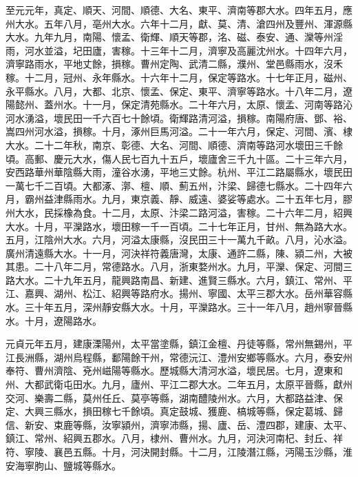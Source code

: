 \begin{pinyinscope}
 至元元年，真定、順天、河間、順德、大名、東平、濟南等郡大水。四年五月，應州大水。五年八月，亳州大水。六年十二月，獻、莫、清、滄四州及豐州、渾源縣大水。九年九月，南陽、懷孟、衛輝、順天等郡，洺、磁、泰安、通、灤等州淫雨，河水並溢，圮田廬，害稼。十三年十二月，濟寧及高麗沈州水。十四年六月，濟寧路雨水，平地丈餘，損稼。曹州定陶、武清二縣，濮州、堂邑縣雨水，沒禾稼。十二月，冠州、永年縣水。十六年十二月，保定等路水。十七年正月，磁州、永平縣水。八月，大都、北京、懷孟、保定、東平、濟寧等路水。十八年二月，遼陽懿州、蓋州水。十一月，保定清苑縣水。二十年六月，太原、懷孟、河南等路沁河水湧溢，壞民田一千六百七十餘頃。衛輝路清河溢，損稼。南陽府唐、鄧、裕、嵩四州河水溢，損稼。十月，涿州巨馬河溢。二十一年六月，保定、河間、濱、棣大水。二十二年秋，南京、彰德、大名、河間、順德、濟南等路河水壞田三千餘頃。高郵、慶元大水，傷人民七百九十五戶，壞廬舍三千九十區。二十三年六月，安西路華州華陰縣大雨，潼谷水湧，平地三丈餘。杭州、平江二路屬縣水，壞民田一萬七千二百頃。大都涿、漷、檀、順、薊五州，汴梁、歸德七縣水。二十四年六月，霸州益津縣雨水。九月，東京義、靜、威遠、婆娑等處水。二十五年七月，膠州大水，民採橡為食。十二月，太原、汴梁二路河溢，害稼。二十六年二月，紹興大水。十月，平灤路水，壞田稼一千一百頃。二十七年正月，甘州、無為路大水。五月，江陰州大水。六月，河溢太康縣，沒民田三十一萬九千畝。八月，沁水溢。廣州清遠縣大水。十一月，河決祥符義唐灣，太康、通許二縣，陳、潁二州，大被其患。二十八年二月，常德路水。八月，浙東婺州水。九月，平灤、保定、河間三路大水。二十九年五月，龍興路南昌、新建、進賢三縣水。六月，鎮江、常州、平江、嘉興、湖州、松江、紹興等路府水。揚州、寧國、太平三郡大水。岳州華容縣水。三十年五月，深州靜安縣大水。十月，平灤路水。三十一年八月，趙州寧晉縣水。十月，遼陽路水。



 元貞元年五月，建康溧陽州，太平當塗縣，鎮江金檀、丹徒等縣，常州無錫州，平江長洲縣，湖州烏程縣，鄱陽餘干州，常德沅江、澧州安鄉等縣水。六月，泰安州奉符、曹州濟陰、兗州嵫陽等縣水。歷城縣大清河水溢，壞民居。七月，遼東和州、大都武衛屯田水。九月，廬州、平江二郡大水。二年五月，太原平晉縣，獻州交河、樂壽二縣，莫州任丘、莫亭等縣，湖南醴陵州水。六月，大都路益津、保定、大興三縣水，損田稼七千餘頃。真定鼓城、獲鹿、槁城等縣，保定葛城、歸信、新安、束鹿等縣，汝寧潁州，濟寧沛縣，揚、廬、岳、澧四郡，建康、太平、鎮江、常州、紹興五郡水。八月，棣州、曹州水。九月，河決河南杞、封丘、祥符、寧陵、襄邑五縣。十月，河決開封縣。十二月，江陵潛江縣，沔陽玉沙縣，淮安海寧朐山、鹽城等縣水。




\end{pinyinscope}
